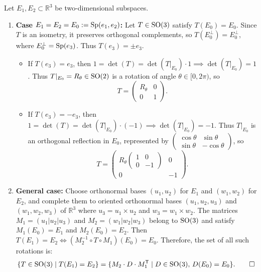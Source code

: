 \begin{exercisesolution*}
\label{sol:so3_rotations_subspaces}
Let $E_1, E_2 \subset \mathbb{R}^3$ be two-dimensional subspaces.
\begin{enumerate}[label=\textbf{(\alph*)}]
    \item \textbf{Case $E_1 = E_2 = E_0 := \operatorname{Sp}(e_1, e_2)$:}
    Let $T \in \operatorname{SO}(3)$ satisfy $T(E_0) = E_0$.
    Since $T$ is an isometry, it preserves orthogonal complements, so $T(E_0^\perp) = E_0^\perp$, where $E_0^\perp = \operatorname{Sp}(e_3)$.
    Thus $T(e_3) = \pm e_3$.
    \begin{itemize}
        \item If $T(e_3) = e_3$, then $1 = \det(T) = \det(T|_{E_0}) \cdot 1 \implies \det(T|_{E_0}) = 1$.
        Thus $T|_{E_0} = R_\theta \in \operatorname{SO}(2)$ is a rotation of angle $\theta \in [0, 2\pi)$, so
        \[
        T = \begin{pmatrix} R_\theta & 0 \\ 0 & 1 \end{pmatrix}.
        \]
        \item If $T(e_3) = -e_3$, then $1 = \det(T) = \det(T|_{E_0}) \cdot (-1) \implies \det(T|_{E_0}) = -1$.
        Thus $T|_{E_0}$ is an orthogonal reflection in $E_0$, represented by $\left(\begin{smallmatrix} \cos\theta & \sin\theta \\ \sin\theta & -\cos\theta \end{smallmatrix}\right)$, so
        \[
        T = \begin{pmatrix} R_\theta \begin{pmatrix} 1 & 0 \\ 0 & -1 \end{pmatrix} & 0 \\ 0 & -1 \end{pmatrix}.
        \]
    \end{itemize}

    \item \textbf{General case:}
    Choose orthonormal bases $(u_1, u_2)$ for $E_1$ and $(w_1, w_2)$ for $E_2$, and complete them to oriented orthonormal bases $(u_1, u_2, u_3)$ and $(w_1, w_2, w_3)$ of $\mathbb{R}^3$ where $u_3 = u_1 \times u_2$ and $w_3 = w_1 \times w_2$.
    The matrices $M_1 = (u_1 | u_2 | u_3)$ and $M_2 = (w_1 | w_2 | w_3)$ belong to $\operatorname{SO}(3)$ and satisfy $M_1(E_0) = E_1$ and $M_2(E_0) = E_2$.
    Then $T(E_1) = E_2 \iff (M_2^{-1} \circ T \circ M_1)(E_0) = E_0$.
    Therefore, the set of all such rotations is:
    \[
    \{ T \in \operatorname{SO}(3) \mid T(E_1) = E_2 \} = \{ M_2 \cdot D \cdot M_1^{\mathsf{T}} \mid D \in \operatorname{SO}(3), \, D(E_0) = E_0 \}. \qedhere
    \]
\end{enumerate}
\end{exercisesolution*}
